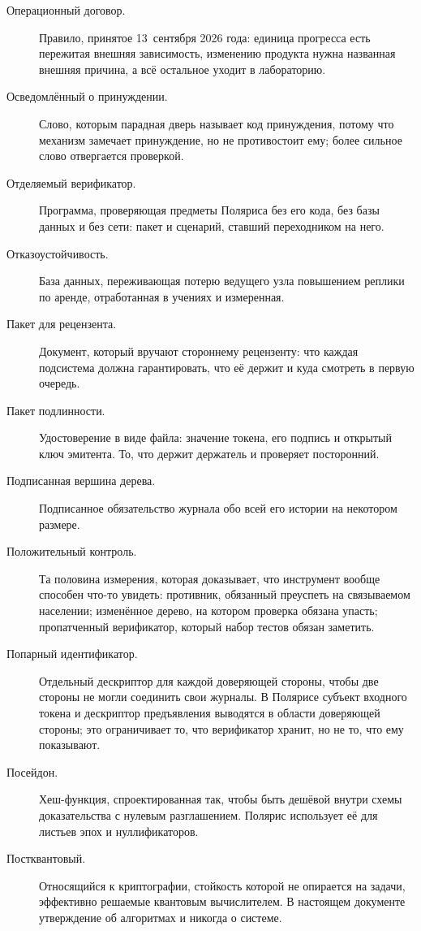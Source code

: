 \begin{description}
  \item[Операционный договор.] Правило, принятое 13~сентября 2026 года: единица прогресса есть пережитая внешняя зависимость, изменению продукта нужна названная внешняя причина, а всё остальное уходит в лабораторию.
  \item[Осведомлённый о принуждении.] Слово, которым парадная дверь называет код принуждения, потому что механизм замечает принуждение, но не противостоит ему; более сильное слово отвергается проверкой.
  \item[Отделяемый верификатор.] Программа, проверяющая предметы Поляриса без его кода, без базы данных и без сети: пакет  и сценарий, ставший переходником на него.
  \item[Отказоустойчивость.] База данных, переживающая потерю ведущего узла повышением реплики по аренде, отработанная в учениях и измеренная.
  \item[Пакет для рецензента.] Документ, который вручают стороннему рецензенту: что каждая подсистема должна
    гарантировать, что её держит и куда смотреть в первую очередь.
  \item[Пакет подлинности.] Удостоверение в виде файла: значение токена, его подпись и открытый ключ эмитента. То, что держит держатель и проверяет посторонний.
  \item[Подписанная вершина дерева.] Подписанное обязательство журнала обо всей его истории на некотором размере.
  \item[Положительный контроль.] Та половина измерения, которая доказывает, что инструмент вообще способен что-то увидеть: противник, обязанный преуспеть на связываемом населении; изменённое дерево, на котором проверка обязана упасть; пропатченный верификатор, который набор тестов обязан заметить.
  \item[Попарный идентификатор.] Отдельный дескриптор для каждой доверяющей стороны, чтобы две стороны не могли соединить свои журналы. В Полярисе субъект входного токена и дескриптор предъявления выводятся в области доверяющей стороны; это ограничивает то, что верификатор хранит, но не то, что ему показывают.
  \item[Посейдон.] Хеш-функция, спроектированная так, чтобы быть дешёвой внутри схемы доказательства с
    нулевым разглашением. Полярис использует её для листьев эпох и нуллификаторов.
  \item[Постквантовый.] Относящийся к криптографии, стойкость которой не опирается на задачи, эффективно решаемые квантовым вычислителем. В настоящем документе утверждение об алгоритмах и никогда о системе.

\end{description}

